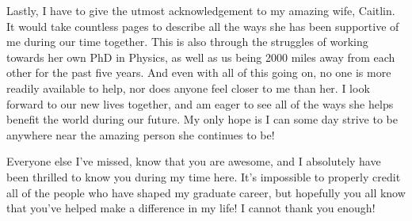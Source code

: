 Lastly, I have to give the utmost acknowledgement to my amazing wife, Caitlin.
It would take countless pages to describe all the ways she has been supportive of me during our time together.
This is also through the struggles of working towards her own PhD in Physics, as well as us being 2000 miles away from each other for the past five years.
And even with all of this going on, no one is more readily available to help, nor does anyone feel closer to me than her.
I look forward to our new lives together, and am eager to see all of the ways she helps benefit the world during our future.
My only hope is I can some day strive to be anywhere near the amazing person she continues to be!

Everyone else I've missed, know that you are awesome, and I absolutely have been thrilled to know you during my time here.
It's impossible to properly credit all of the people who have shaped my graduate career, but hopefully you all know that you've helped make a difference in my life!
I cannot thank you enough!

